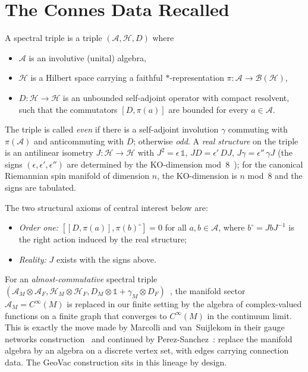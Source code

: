 \documentclass[11pt]{article}
\begin{document}
\section{The Connes Data Recalled}
\label{sec:connes_data}

A spectral triple is a triple $(\mathcal{A}, \mathcal{H}, D)$
where~\cite{connes1995}
\begin{itemize}\setlength{\itemsep}{2pt}
\item $\mathcal{A}$ is an involutive (unital) algebra,
\item $\mathcal{H}$ is a Hilbert space carrying a faithful
$*$-representation $\pi: \mathcal{A} \to \mathcal{B}(\mathcal{H})$,
\item $D : \mathcal{H} \to \mathcal{H}$ is an unbounded self-adjoint
operator with compact resolvent, such that the commutators
$[D, \pi(a)]$ are bounded for every $a \in \mathcal{A}$.
\end{itemize}
The triple is called \emph{even} if there is a self-adjoint involution
$\gamma$ commuting with $\pi(\mathcal{A})$ and anticommuting with $D$;
otherwise \emph{odd}.  A \emph{real structure} on the triple is an
antilinear isometry $J: \mathcal{H} \to \mathcal{H}$ with
$J^2 = \epsilon\,\mathbb{1}$, $JD = \epsilon'\,DJ$,
$J\gamma = \epsilon''\,\gamma J$ (the signs $(\epsilon,\epsilon',
\epsilon'')$ are determined by the $\mathrm{KO}$-dimension
mod~$8$~\cite{connes1995}); for the canonical Riemannian spin
manifold of dimension $n$, the $\mathrm{KO}$-dimension is $n$ mod~$8$
and the signs are tabulated.

The two structural axioms of central interest below are:
\begin{itemize}
\item[(\textbf{O1})] \emph{Order one:} $[[D, \pi(a)], \pi(b)^{\circ}]
= 0$ for all $a, b \in \mathcal{A}$, where $b^{\circ} = JbJ^{-1}$ is
the right action induced by the real structure;
\item[(\textbf{R})] \emph{Reality:} $J$ exists with the signs above.
\end{itemize}

For an \emph{almost-commutative} spectral triple
$(\mathcal{A}_M \otimes \mathcal{A}_F, \mathcal{H}_M \otimes
\mathcal{H}_F, D_M \otimes \mathbb{1} + \gamma_M \otimes
D_F)$~\cite{vansuijlekom_book2015,chamseddine_connes2010}, the
manifold sector $\mathcal{A}_M = C^{\infty}(M)$ is replaced in our
finite setting by the algebra of complex-valued functions on a finite
graph that converges to $C^{\infty}(M)$ in the continuum limit.  This
is exactly the move made by Marcolli and van~Suijlekom in their gauge
networks construction~\cite{marcolli_vs2014} and continued by
Perez-Sanchez~\cite{perez_sanchez2024,perez_sanchez2025}: replace the
manifold algebra by an algebra on a discrete vertex set, with edges
carrying connection data.  The GeoVac construction sits in this
lineage by design.
\end{document}
